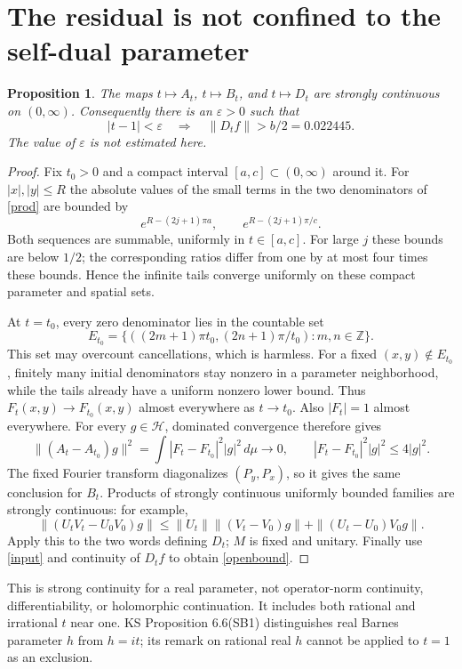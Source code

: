 \documentclass[11pt,a4paper]{article}
\newcommand{\HH}{\mathcal H}
\newtheorem{proposition}{Proposition}
\begin{document}
\section{The residual is not confined to the self-dual parameter}
\begin{proposition}
The maps $t\mapsto A_t$, $t\mapsto B_t$, and $t\mapsto D_t$ are strongly
continuous on $(0,\infty)$. Consequently there is an $\varepsilon>0$
such that
\begin{equation}
 |t-1|<\varepsilon\quad\Longrightarrow\quad
 \|D_tf\|>b/2=0.022445.\label{openbound}
\end{equation}
The value of $\varepsilon$ is not estimated here.
\end{proposition}
\begin{proof}
Fix $t_0>0$ and a compact interval $[a,c]\subset(0,\infty)$ around it.
For $|x|,|y|\le R$ the absolute values of the small terms in the two
denominators of \eqref{prod} are bounded by
\[
 e^{R-(2j+1)\pi a},\qquad e^{R-(2j+1)\pi/c}.
\]
Both sequences are summable, uniformly in $t\in[a,c]$. For large $j$
these bounds are below $1/2$; the corresponding ratios differ from
one by at most four times these bounds. Hence the infinite tails
converge uniformly on these compact parameter and spatial sets.

At $t=t_0$, every zero denominator lies in the countable set
\[
 E_{t_0}=\{((2m+1)\pi t_0,(2n+1)\pi/t_0):m,n\in\mathbb Z\}.
\]
This set may overcount cancellations, which is harmless. For a fixed
$(x,y)\notin E_{t_0}$, finitely many initial denominators stay nonzero in
a parameter neighborhood, while the tails already have a uniform
nonzero lower bound. Thus $F_t(x,y)\to F_{t_0}(x,y)$ almost everywhere
as $t\to t_0$. Also $|F_t|=1$ almost everywhere. For every $g\in\HH$,
dominated convergence therefore gives
\[
 \|(A_t-A_{t_0})g\|^2
 =\int |F_t-F_{t_0}|^2|g|^2\,d\mu\longrightarrow0,
 \qquad |F_t-F_{t_0}|^2|g|^2\le4|g|^2.
\]
The fixed Fourier transform diagonalizes $(P_y,P_x)$, so it gives the
same conclusion for $B_t$. Products of strongly continuous uniformly
bounded families are strongly continuous: for example,
\[
 \|(U_tV_t-U_0V_0)g\|
 \le \|U_t\|\|(V_t-V_0)g\|+\|(U_t-U_0)V_0g\|.
\]
Apply this to the two words defining $D_t$; $M$ is fixed and unitary.
Finally use \eqref{input} and continuity of $D_tf$ to obtain
\eqref{openbound}.
\end{proof}
This is strong continuity for a real parameter, not operator-norm
continuity, differentiability, or holomorphic continuation. It includes
both rational and irrational $t$ near one. KS Proposition 6.6(SB1)
distinguishes real Barnes parameter $h$ from $h=it$; its remark on
rational real $h$ cannot be applied to $t=1$ as an exclusion.
\end{document}
